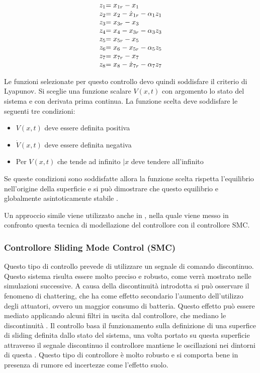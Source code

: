 \begin{equation}\label{eq:SistemaQuadrirotore-BACKERR}
	\begin{array}{r@{}l}
		z_1 & = x_{1r} -x_1 \\
		z_2 & = x_2 - \dot{x}_{1r} - \alpha_1 z_1 \\
		z_3 & = x_{3r} - x_3 \\
		z_4 & = x_4 - x_{3r} - \alpha_3 z_3 \\
		z_5 & = x_{5r} -x_5 \\
		z_6 & = x_6 - x_{5r} - \alpha_5 z_5 \\
		z_7 &= x_{7r} - x_7 \\
		z_8 &= x_8 - \dot{x}_{7r} - \alpha_7 z_7
	\end{array}
\end{equation}

Le funzioni selezionate per questo controllo devo quindi soddisfare il criterio di Lyapunov. Si sceglie una funzione scalare $V(x,t)$ con argomento lo stato del sistema e con derivata prima continua. La funzione scelta deve soddisfare le seguenti tre condizioni:
\begin{itemize}
	\item $V(x,t)$ deve essere definita positiva
	\item $\dot{V}(x,t)$ deve essere definita negativa
	\item Per $V(x,t)$ che tende ad infinito $\mid{x}$ deve tendere all'infinito
\end{itemize}
Se queste condizioni sono soddisfatte allora la funzione scelta rispetta l'equilibrio nell'origine della superficie e si può dimostrare che questo equilibrio e globalmente asintoticamente stabile \cite{DesTestCarm}.

Un approccio simile viene utilizzato anche in \cite{Backstepping1}, nella quale viene messo in confronto questa tecnica di modellazione del controllore con il controllore SMC.

\subsubsection{Controllore Sliding Mode Control (SMC)}

Questo tipo di controllo prevede di utilizzare un segnale di comando discontinuo. Questo sistema risulta essere molto preciso e robusto, come verrà mostrato nelle simulazioni successive. A causa della discontinuità introdotta si può  osservare il fenomeno di chattering, che ha come effetto secondario l'aumento dell'utilizzo degli attuatori, ovvero un maggior consumo di batteria. Questo effetto può essere mediato applicando alcuni filtri in uscita dal controllore, che mediano le discontinuità \cite{KimJinho2020ACSo}. Il controllo basa il funzionamento sulla definizione di una superfice di sliding definita dallo stato del sistema, una volta portato su questa superficie attraverso il segnale discontinuo il controllore mantiene le oscillazioni nei dintorni di questa \cite{DesTestCarm}. Questo tipo di controllore è molto robusto e si comporta bene in presenza di rumore ed incertezze come l'effetto suolo.

